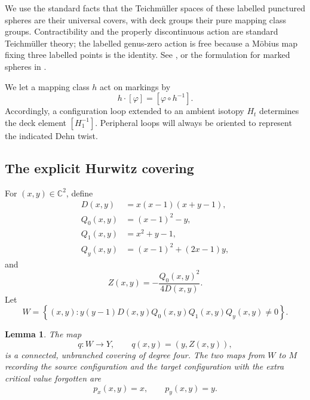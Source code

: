 \documentclass[11pt]{article}
\newcommand{\C}{\mathbb C}
\newtheorem{lemma}[theorem]{Lemma}
\theoremstyle{definition}
\theoremstyle{remark}
\begin{document}
We use the standard facts that the Teichm\"uller spaces of these
labelled punctured spheres are their universal covers, with deck
groups their pure mapping class groups.  Contractibility and the
properly discontinuous action are standard Teichm\"uller theory;
the labelled genus-zero action is free because a M\"obius map fixing
three labelled points is the identity.  See
\cite[Chapters~10 and~12]{FM}, or the formulation for marked spheres in
\cite[Section~2.2]{HK}.

We let a mapping class $h$ act on markings by
\[
h\cdot[\varphi]=[\varphi\circ h^{-1}].
\]
Accordingly, a configuration loop extended to an ambient isotopy
$H_t$ determines the deck element $[H_1^{-1}]$.
Peripheral loops will always be oriented to represent the indicated
Dehn twist.

\subsection{The explicit Hurwitz covering}

For $(x,y)\in\C^2$, define
\[
\begin{split}
D(x,y)&=x(x-1)(x+y-1),\\
Q_0(x,y)&=(x-1)^2-y,\\
Q_1(x,y)&=x^2+y-1,\\
Q_y(x,y)&=(x-1)^2+(2x-1)y,
\end{split}
\]
and
\begin{equation}\label{eq:Z}
Z(x,y)=-\frac{Q_0(x,y)^2}{4D(x,y)}.
\end{equation}
Let
\begin{equation}\label{eq:W}
W=
\left\{(x,y):
y(y-1)D(x,y)Q_0(x,y)Q_1(x,y)Q_y(x,y)\ne0
\right\}.
\end{equation}

\begin{lemma}\label{lem:cover}
The map
\[
q:W\longrightarrow Y,\qquad q(x,y)=(y,Z(x,y)),
\]
is a connected, unbranched covering of degree four.
The two maps from $W$ to $M$ recording the source configuration and
the target configuration with the extra critical value forgotten are
\[
p_x(x,y)=x,\qquad p_y(x,y)=y.
\]
\end{lemma}
\end{document}
